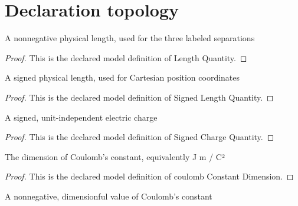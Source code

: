 \section{Declaration topology}
\begin{definition}
  \label{def:physics:phyx-mini-0854:phyxminiproblems-problemphyxmini0854-lengthquantity}
  A nonnegative physical length, used for the three labeled separations
\end{definition}
\begin{proof}
  This is the declared model definition of Length Quantity.
\end{proof}
\begin{definition}
  \label{def:physics:phyx-mini-0854:phyxminiproblems-problemphyxmini0854-signedlengthquantity}
  A signed physical length, used for Cartesian position coordinates
\end{definition}
\begin{proof}
  This is the declared model definition of Signed Length Quantity.
\end{proof}
\begin{definition}
  \label{def:physics:phyx-mini-0854:phyxminiproblems-problemphyxmini0854-signedchargequantity}
  A signed, unit-independent electric charge
\end{definition}
\begin{proof}
  This is the declared model definition of Signed Charge Quantity.
\end{proof}
\begin{definition}
  \label{def:physics:phyx-mini-0854:phyxminiproblems-problemphyxmini0854-coulombconstantdimension}
  The dimension of Coulomb's constant, equivalently J m / C²
\end{definition}
\begin{proof}
  This is the declared model definition of coulomb Constant Dimension.
\end{proof}
\begin{definition}
  \label{def:physics:phyx-mini-0854:phyxminiproblems-problemphyxmini0854-coulombconstantquantity}
  A nonnegative, dimensionful value of Coulomb's constant
\end{definition}
